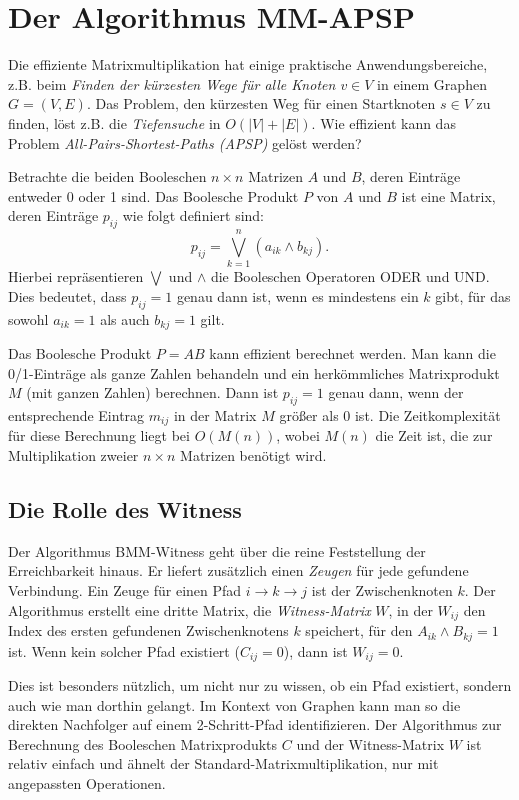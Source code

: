 \documentclass{scrartcl}
\numberwithin{equation}{section}
\begin{document}
\section{Der Algorithmus MM-APSP}
Die effiziente Matrixmultiplikation hat einige praktische Anwendungsbereiche, z.B. beim \textit{Finden der kürzesten Wege für alle Knoten $v \in V$} in einem Graphen $G = (V, E)$. Das Problem, den kürzesten Weg für einen Startknoten $s \in V$ zu finden, löst z.B. die \textit{Tiefensuche} in $O(\left|V\right|  + \left| E\right|)$. Wie effizient kann das Problem \textit{All-Pairs-Shortest-Paths (APSP)} gelöst werden?

Betrachte die beiden Booleschen $n \times n$ Matrizen $A$ und $B$, deren Einträge entweder 0 oder 1 sind. Das Boolesche Produkt $P$ von $A$ und $B$ ist eine Matrix, deren Einträge $p_{ij}$ wie folgt definiert sind:
$$p_{ij}=\bigvee_{k=1}^{n}(a_{ik}\wedge b_{kj}).$$
Hierbei repräsentieren $\bigvee$ und $\wedge$ die Booleschen Operatoren ODER und UND. Dies bedeutet, dass $p_{ij}=1$ genau dann ist, wenn es mindestens ein $k$ gibt, für das sowohl $a_{ik}=1$ als auch $b_{kj}=1$ gilt.

Das Boolesche Produkt $P=AB$ kann effizient berechnet werden. Man kann die 0/1-Einträge als ganze Zahlen behandeln und ein herkömmliches Matrixprodukt $M$ (mit ganzen Zahlen) berechnen. Dann ist $p_{ij}=1$ genau dann, wenn der entsprechende Eintrag $m_{ij}$ in der Matrix $M$ größer als 0 ist. Die Zeitkomplexität für diese Berechnung liegt bei $O(M(n))$, wobei $M(n)$ die Zeit ist, die zur Multiplikation zweier $n \times n$ Matrizen benötigt wird.

\subsection{Die Rolle des Witness}
Der Algorithmus BMM-Witness geht über die reine Feststellung der Erreichbarkeit hinaus. Er liefert zusätzlich einen \textit{Zeugen} für jede gefundene Verbindung. Ein Zeuge für einen Pfad $i \to k \to j$ ist der Zwischenknoten $k$. Der Algorithmus erstellt eine dritte Matrix, die \textit{Witness-Matrix} $W$, in der $W_{ij}$ den Index des ersten gefundenen Zwischenknotens $k$ speichert, für den $A_{ik} \land B_{kj} = 1$ ist. Wenn kein solcher Pfad existiert ($C_{ij} = 0$), dann ist $W_{ij} = 0$.

Dies ist besonders nützlich, um nicht nur zu wissen, ob ein Pfad existiert, sondern auch wie man dorthin gelangt. Im Kontext von Graphen kann man so die direkten Nachfolger auf einem 2-Schritt-Pfad identifizieren. Der Algorithmus zur Berechnung des Booleschen Matrixprodukts $C$ und der Witness-Matrix $W$ ist relativ einfach und ähnelt der Standard-Matrixmultiplikation, nur mit angepassten Operationen.
\end{document}
